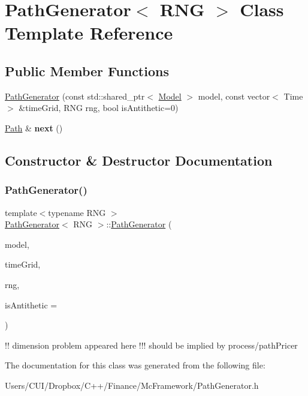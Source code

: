 \hypertarget{class_path_generator}{}\section{Path\+Generator$<$ R\+NG $>$ Class Template Reference}
\label{class_path_generator}
\subsection*{Public Member Functions}
\begin{DoxyCompactItemize}
\item 
\hyperlink{class_path_generator_a7cd1bbe2d0d6afc8b7a6b812553deacc}{Path\+Generator} (const std\+::shared\+\_\+ptr$<$ \hyperlink{class_model}{Model} $>$ model, const vector$<$ Time $>$ \&time\+Grid, R\+NG rng, bool is\+Antithetic=0)
\item 
\hypertarget{class_path_generator_a848a4f432d86df5b03d835d99472ab37}{}\label{class_path_generator_a848a4f432d86df5b03d835d99472ab37} 
\hyperlink{class_path}{Path} \& {\bfseries next} ()
\end{DoxyCompactItemize}


\subsection{Constructor \& Destructor Documentation}
\hypertarget{class_path_generator_a7cd1bbe2d0d6afc8b7a6b812553deacc}{}\label{class_path_generator_a7cd1bbe2d0d6afc8b7a6b812553deacc} 
\subsubsection{\texorpdfstring{Path\+Generator()}{PathGenerator()}}
{\footnotesize\ttfamily template$<$typename R\+NG $>$ \\
\hyperlink{class_path_generator}{Path\+Generator}$<$ R\+NG $>$\+::\hyperlink{class_path_generator}{Path\+Generator} (\begin{DoxyParamCaption}\item[{const std\+::shared\+\_\+ptr$<$ \hyperlink{class_model}{Model} $>$}]{model,  }\item[{const vector$<$ Time $>$ \&}]{time\+Grid,  }\item[{R\+NG}]{rng,  }\item[{bool}]{is\+Antithetic = {} }\end{DoxyParamCaption})}

!! dimension problem appeared here !!! should be implied by process/path\+Pricer 

The documentation for this class was generated from the following file\+:\begin{DoxyCompactItemize}
\item 
Users/\+C\+U\+I/\+Dropbox/\+C++/\+Finance/\+Mc\+Framework/Path\+Generator.\+h\end{DoxyCompactItemize}
